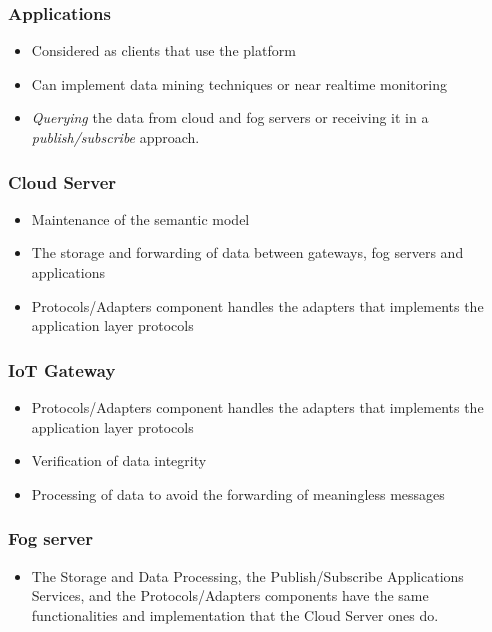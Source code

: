 \documentclass{../iot-lecture}
\begin{document}
\begin{frame}
  \frametitle{Applications}
  \begin{itemize}
    \item Considered as clients that use the platform
    \item Can implement data mining techniques or near realtime monitoring
    \item \textit{Querying} the data from cloud and fog servers or receiving it in a \textit{publish/subscribe} approach.
  \end{itemize}
\end{frame}

\begin{frame}
  \frametitle{Cloud Server}
  \begin{itemize}
    \item Maintenance of the semantic model
    \item The storage and forwarding of data between gateways, fog servers and applications
    \item Protocols/Adapters component handles the adapters that implements the application layer protocols
  \end{itemize}
\end{frame}

\begin{frame}
  \frametitle{IoT Gateway}
  \begin{itemize}
    \item Protocols/Adapters component handles the adapters that implements the application layer protocols
    \item Verification of data integrity
    \item Processing of data to avoid the forwarding of meaningless messages
  \end{itemize}
\end{frame}

\begin{frame}
  \frametitle{Fog server}
  \begin{itemize}
    \item The Storage and Data Processing, the Publish/Subscribe Applications Services, and the Protocols/Adapters components have the
      same functionalities and implementation that the Cloud Server ones do.
  \end{itemize}
\end{frame}
\end{document}
